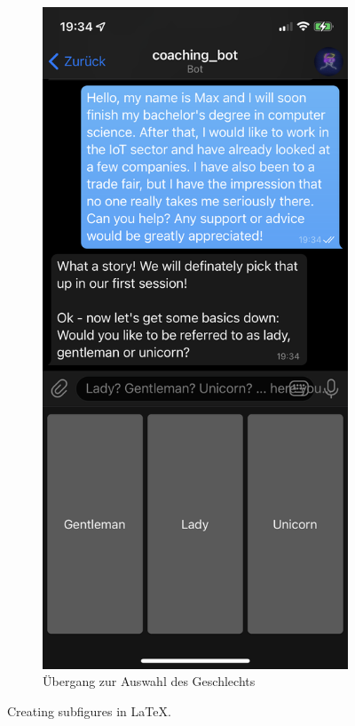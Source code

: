 \begin{figure}
		\hfill
		
		\begin{subfigure}{0.3\textwidth}
			\includegraphics[width=\textwidth]{images/Screenshots/gender.PNG}
			\caption{Übergang zur Auswahl des Geschlechts}
			\label{fig: scs..gender}
		\end{subfigure}
				
		\caption{Creating subfigures in \LaTeX.}
		
		\label{fig:figures}

	\end{figure}

